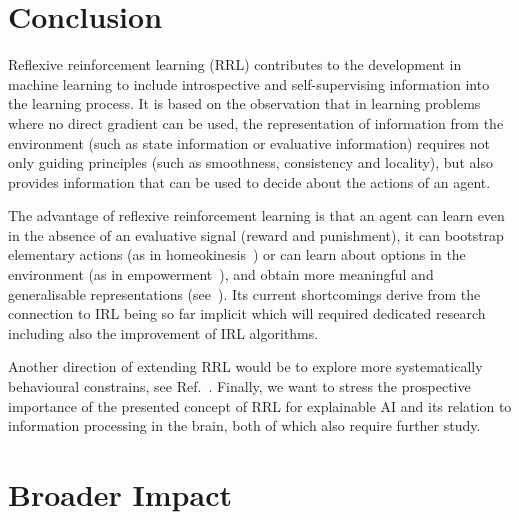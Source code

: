 \documentclass{article}
\begin{document}

\section{Conclusion}

Reflexive reinforcement learning (RRL) contributes to the development in machine learning
to include introspective and self-supervising information into the learning process. 
It is based on the observation that in learning problems where no direct gradient can be used, the representation of information from the environment (such as state information or evaluative information) requires not only guiding principles (such as smoothness, consistency and locality), but also provides information that can be used to decide about the actions of an agent.

The advantage of reflexive reinforcement learning is that an agent can learn 
even in the absence of an evaluative signal (reward and punishment), it can 
bootstrap elementary actions (as in homeokinesis~\citep{der2012playful}) or can learn about options in the environment (as in empowerment~\citep{klyubin2005empowerment}),
and obtain more meaningful and generalisable representations (see~\citep{smith2018evaluation}).
Its current shortcomings derive from the connection to IRL being so far implicit which will required dedicated research including also the improvement of IRL algorithms. 

Another direction of extending RRL would be to explore more systematically behavioural constrains, see 
Ref.~\cite{balakrishnan2019incorporating}.
Finally, we want to stress the prospective importance of the presented concept of RRL for 
explainable AI and its relation to information processing in the brain, both of which also require
further study.

\section*{Broader Impact}
\end{document}
